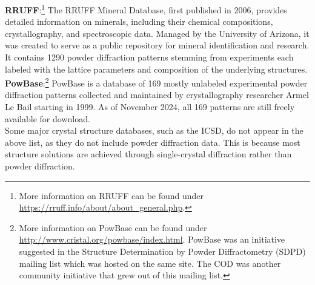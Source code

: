 \textbf{RRUFF}:\footnote{More information on RRUFF can be found under \url{https://rruff.info/about/about_general.php}.} The RRUFF Mineral Database, first published in 2006, provides detailed information on minerals, including their chemical compositions, crystallography, and spectroscopic data. Managed by the University of Arizona, it was created to serve as a public repository for mineral identification and research. It contains \num{1290} powder diffraction patterns stemming from experiments each labeled with the lattice parameters and composition of the underlying structures. \\

\textbf{PowBase}:\footnote{More information on PowBase can be found under \url{http://www.cristal.org/powbase/index.html}. PowBase was an initiative suggested in the Structure Determination by
Powder Diffractometry (SDPD) mailing list which was hosted on the same site. The COD was another community initiative that grew out of this mailing list.} PowBase is a database of 169 mostly unlabeled experimental powder diffraction patterns collected and maintained by crystallography researcher Armel Le Bail starting in 1999. As of November 2024, all 169 patterns are still freely available for download. \\



Some major crystal structure databases, such as the ICSD, do not appear in the above list, as they do not include powder diffraction data. This is because most structure solutions are achieved through single-crystal diffraction rather than powder diffraction.
 

